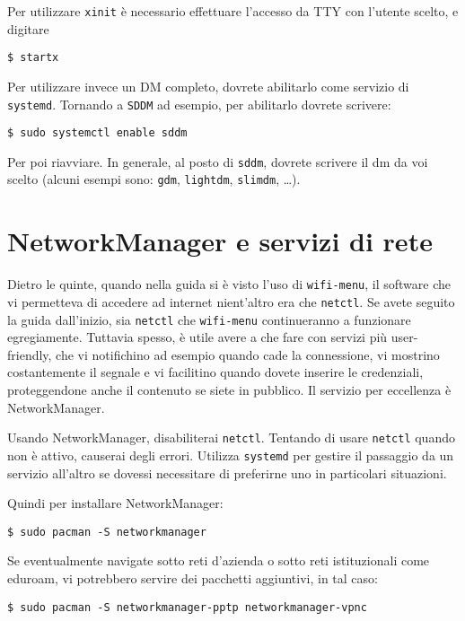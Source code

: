 \documentclass[twoside,italian]{book}
\newcommand{\code}[1]{\texttt{#1}}
\begin{document}
    Per utilizzare \code{xinit} è necessario effettuare l'accesso da \ac{TTY} con l'utente scelto, e digitare 
    \begin{lstlisting}
$ startx
    \end{lstlisting}
    Per utilizzare invece un \ac{DM} completo, dovrete abilitarlo come servizio di \code{systemd}.
    Tornando a \code{SDDM} ad esempio, per abilitarlo dovrete scrivere: 
    \begin{lstlisting}
$ sudo systemctl enable sddm
    \end{lstlisting}
    Per poi riavviare. In generale, al posto di \code{sddm}, dovrete scrivere il dm da voi scelto (alcuni esempi sono: \code{gdm}, \code{lightdm}, \code{slimdm}, \dots).
    
\section{NetworkManager e servizi di rete}
    Dietro le quinte, quando nella guida si è visto l'uso di \code{wifi-menu}, il software che vi permetteva di accedere ad internet nient'altro era che \code{netctl}. Se avete seguito la guida dall'inizio, sia \code{netctl} che \code{wifi-menu} continueranno a funzionare egregiamente. 
    Tuttavia spesso, è utile avere a che fare con servizi più user-friendly, che vi notifichino ad esempio quando cade la connessione, vi mostrino costantemente il segnale e vi facilitino quando dovete inserire le credenziali, proteggendone anche il contenuto se siete in pubblico.
    Il servizio per eccellenza è NetworkManager.
    
    \begin{tcolorbox}[floatplacement=b,width=\textwidth,title={NOTA BENE:}, colback={lightgray},colbacktitle=gray,coltitle=white,colupper=black]
        Usando NetworkManager, disabiliterai \code{netctl}. Tentando di usare \code{netctl} quando non è attivo, causerai degli errori. Utilizza \code{systemd} per gestire il passaggio da un servizio all'altro se dovessi necessitare di preferirne uno in particolari situazioni.
    \end{tcolorbox}

    Quindi per installare NetworkManager: 
    \begin{lstlisting}
$ sudo pacman -S networkmanager
    \end{lstlisting}
    Se eventualmente navigate sotto reti d'azienda o sotto reti istituzionali come eduroam, vi potrebbero servire dei pacchetti aggiuntivi, in tal caso:
    \begin{lstlisting}
$ sudo pacman -S networkmanager-pptp networkmanager-vpnc
    \end{lstlisting}
    
\end{document}
